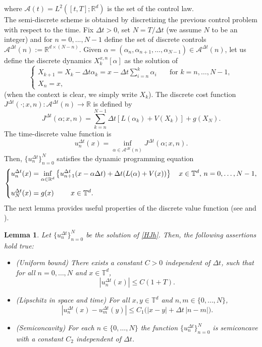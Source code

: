 \documentclass[11pt]{amsart}
\newtheorem{lemma}[thm]{Lemma}
\theoremstyle{remark}
\theoremstyle{definition}
\theoremstyle{Claim}
\newcommand{\T}{{\mathbb{T}}}
\newcommand{\R}{\mathbb{R}}
\newcommand{\mA}{\mathcal A}
\theoremstyle{plain}
\newcommand{\dt}{{\Delta t}}
\begin{document}
where $\mathcal{A}(t)=L^2([t,T];\R^d)$ is the set of the control law. \\
The semi-discrete scheme is obtained by discretizing the previous control problem with respect to the time. Fix $\dt>0$, set $N=T/\dt$ (we assume $N$ to be an integer) and  for $n=0,...,N-1$ define the set of   discrete controls $\mA^\dt(n) :=\R^{d\times (N-n)}$. Given $\alpha=(\alpha_n,\alpha_{n+1},\dots,\alpha_{N-1})\in\mA^\dt(n)$, let us define the discrete dynamics $X_{k}^{x,n}[\alpha]$ as the solution of
\begin{equation}\label{dynh}
\left\{
\begin{array}{lcl}
	X_{k+1}=X_k-\dt\alpha_k = x- \dt \sum_{i=n}^{k}\alpha_{i}  \quad& \mbox{for } k=n,\dots,N-1,\\
	X_n=x,
\end{array}
\right.
\end{equation}
(when the context is clear, we simply write $X_k$). The  discrete cost function  $J^\dt( \cdot; x, n): \mA^\dt(n) \to \R$ is defined by
\begin{equation*}
J^\dt(\alpha;x,n)=\sum_{k=n}^{N-1}\dt [ L( \alpha_k)+V(X_k) ]  +g(X_N).
\end{equation*}
The time-discrete value function is
\begin{equation}\label{valueh}
   u^\dt_n(x)=\inf_{\alpha \in \mA^\dt(n)} J^\dt(\alpha ;x,n).
\end{equation}
Then, $\{u_n^\dt\}_{n=0}^{N}$ satisfies the   dynamic programming equation
\begin{equation}\label{HJh}
\left\{
\begin{split} 
&	u^\dt_n(x)=\inf_{\alpha\in \R^{d}}\left\{u^\dt_{n+1}(x-\alpha\dt)+ \dt (L(  \alpha)+  V(x))\right\}  \quad   x\in\T^d,\,  n=0,\dots,N-1,\\[6pt]
&	u^\dt_N(x)= g(x)    \hskip 24pt x\in\T^d.
\end{split}
\right.
\end{equation}
The next lemma provides useful properties of the discrete value function (see \cite[Lemma 3.2]{csl} and \cite{g}).
\begin{lemma}\label{lemma:prop_semilag} 
	Let $\{u^\dt_n\}_{n=0}^N$ be the solution of \eqref{HJh}. Then, the following assertions hold true: 
	\begin{itemize}
\item[(i)]  (Uniform bound) There exists a constant $C>0$ independent of $\dt$, such that for all \(n=0,\dots,N\) and \(x\in\T^d\),
  \[
    |u^\dt_n(x)| \le C(1+T).
  \]
\item[(ii)]  (Lipschitz in space and time) For all \(x,y\in\T^d\) and \(n,m\in\{0,\dots,N\}\),
  \begin{equation}\label{estim_Lip_corrected}
    |u^\dt_n(x)-u^\dt_m(y)| \le C_1\big(|x-y| + \Delta t\,|n-m|\big).
  \end{equation}
 \item[(iii)]  (Semiconcavity) For each \(n\in\{0,\dots,N\}\) the function \(\{u^\dt_n\}_{n=0}^N\) is semiconcave with a constant \(C_2\) independent of \(\Delta t\).
	\end{itemize}
\end{lemma}
\end{document}
